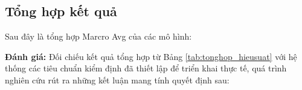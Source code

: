 \documentclass[a4paper,11pt]{article}
\begin{document}
\subsection{Tổng hợp kết quả}
Sau đây là tổng hợp Marcro Avg của các mô hình:
\begin{table}[H]
    \centering
    \caption{Bảng tổng hợp so sánh hiệu suất giữa các mô hình (Chọn ngưỡng tối ưu Recall)}
    \label{tab:tonghop_hieusuat}
    \renewcommand{\arraystretch}{1.4} %
\end{table}
\textbf{Đánh giá: }Đối chiếu kết quả tổng hợp từ Bảng \ref{tab:tonghop_hieusuat} với hệ thống các tiêu chuẩn kiểm định đã thiết lập để triển khai thực tế, quá trình nghiên cứu rút ra những kết luận mang tính quyết định sau:
\end{document}
